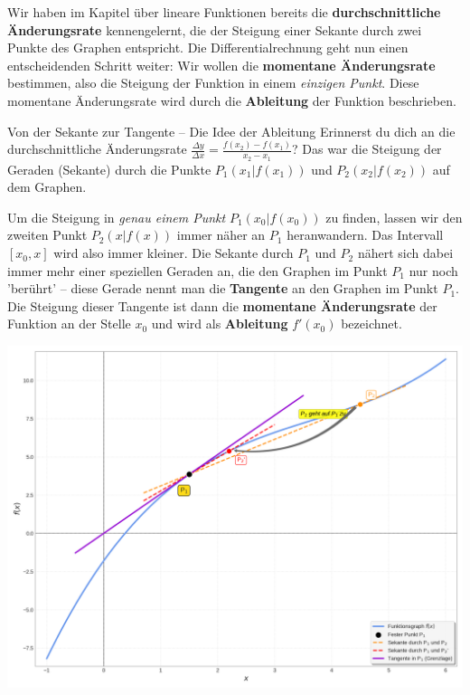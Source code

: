 Wir haben im Kapitel über lineare Funktionen bereits die \textbf{durchschnittliche Änderungsrate} kennengelernt, die der Steigung einer Sekante durch zwei Punkte des Graphen entspricht. Die Differentialrechnung geht nun einen entscheidenden Schritt weiter: Wir wollen die \textbf{momentane Änderungsrate} bestimmen, also die Steigung der Funktion in einem \textit{einzigen Punkt}. Diese momentane Änderungsrate wird durch die \textbf{Ableitung} der Funktion beschrieben.

\begin{infoboxumgebung}{Von der Sekante zur Tangente – Die Idee der Ableitung}
Erinnerst du dich an die durchschnittliche Änderungsrate $\frac{\Delta y}{\Delta x} = \frac{f(x_2)-f(x_1)}{x_2-x_1}$? Das war die Steigung der Geraden (Sekante) durch die Punkte $P_1(x_1|f(x_1))$ und $P_2(x_2|f(x_2))$ auf dem Graphen.

Um die Steigung in \textit{genau einem Punkt} $P_1(x_0|f(x_0))$ zu finden, lassen wir den zweiten Punkt $P_2(x|f(x))$ immer näher an $P_1$ heranwandern. Das Intervall $[x_0, x]$ wird also immer kleiner. Die Sekante durch $P_1$ und $P_2$ nähert sich dabei immer mehr einer speziellen Geraden an, die den Graphen im Punkt $P_1$ nur noch 'berührt' – diese Gerade nennt man die \textbf{Tangente} an den Graphen im Punkt $P_1$.
Die Steigung dieser Tangente ist dann die \textbf{momentane Änderungsrate} der Funktion an der Stelle $x_0$ und wird als \textbf{Ableitung} $f'(x_0)$ bezeichnet.

\begin{center}
    \includegraphics[scale=0.5]{grafiken/Differentialrechnung_Sekante_Tangente.png}
    \label{fig:sek_zu_tan}
\end{center}


\end{infoboxumgebung}
